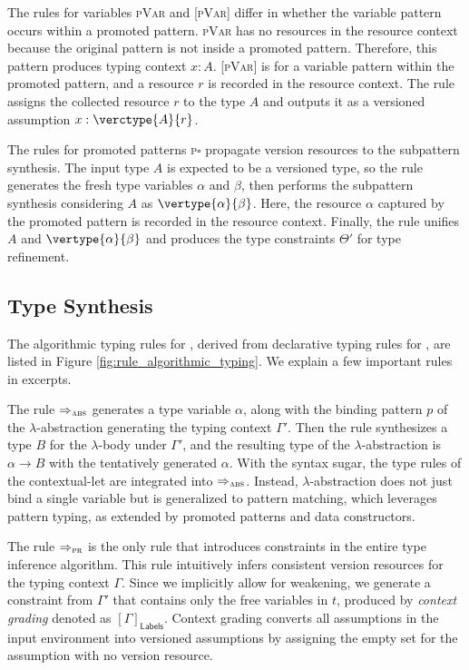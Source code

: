 The rules for variables \textsc{pVar} and \textsc{[pVar]} differ in whether the variable pattern occurs within a promoted pattern. \textsc{pVar} has no resources in the resource context because the original pattern is not inside a promoted pattern. Therefore, this pattern produces typing context $x:A$. \textsc{[pVar]} is for a variable pattern within the promoted pattern, and a resource $r$ is recorded in the resource context. The rule assigns the collected resource $r$ to the type $A$ and outputs it as a versioned assumption $x:\verctype{A}{r}$.

The rules for promoted patterns \textsc{p}$\square$
propagate version resources to the subpattern synthesis. The input type $A$ is expected to be a versioned type, so the rule generates the fresh type variables $\alpha$ and $\beta$, then performs the subpattern synthesis considering $A$ as $\vertype{\alpha}{\beta}$. Here, the resource $\alpha$ captured by the promoted pattern is recorded in the resource context. Finally, the rule unifies $A$ and $\vertype{\alpha}{\beta}$ and produces the type constraints $\Theta'$ for type refinement.









\subsection{Type Synthesis}
The algorithmic typing rules for \vlmini{}, derived from declarative typing rules for \corelang{}, are listed in Figure \ref{fig:rule_algorithmic_typing}. We explain a few important rules in excerpts.

The rule $\Rightarrow_{\textsc{abs}}$ generates a type variable $\alpha$, along with the binding pattern $p$ of the $\lambda$-abstraction generating the typing context $\Gamma'$. Then the rule synthesizes a type $B$ for the $\lambda$-body under $\Gamma'$, and the resulting type of the $\lambda$-abstraction is $\alpha \rightarrow B$ with the tentatively generated $\alpha$.
With the syntax sugar, the type rules of the contextual-let are integrated into $\Rightarrow_{\textsc{abs}}$.
Instead, $\lambda$-abstraction does not just bind a single variable but is generalized to pattern matching, which leverages pattern typing, as extended by promoted patterns and data constructors. 

The rule $\Rightarrow_{\textsc{pr}}$ is the only rule that introduces constraints in the entire type inference algorithm.
This rule intuitively infers consistent version resources for the typing context $\Gamma$. Since we implicitly allow for weakening, we generate a constraint from $\Gamma'$ that contains only the free variables in $t$, produced by \emph{context grading} denoted as $[\Gamma]_\textsf{Labels}$.
Context grading converts all assumptions in the input environment into versioned assumptions by assigning the empty set
for the assumption with no version resource.

